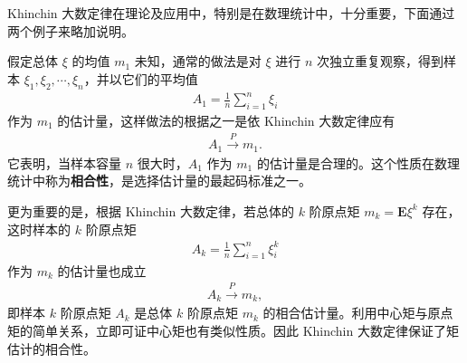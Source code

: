 \documentclass[../../main.tex]{subfiles}
\begin{document}
Khinchin 大数定律在理论及应用中，特别是在数理统计中，十分重要，下面通过两个例子来略加说明。

\begin{example}[矩估计的相合性]\label{example:ch05-矩估计相合性}
假定总体 $\xi$ 的均值 $m_1$ 未知，通常的做法是对 $\xi$ 进行 $n$ 次独立重复观察，得到样本 $\xi_1,\xi_2,\cdots,\xi_n$，并以它们的平均值
\begin{align*}
A_1=\frac1n\sum_{i=1}^{n}\xi_i
\end{align*}
作为 $m_1$ 的估计量，这样做法的根据之一是依 Khinchin 大数定律应有
\begin{align*}
A_1\xrightarrow{P}m_1.
\end{align*}
它表明，当样本容量 $n$ 很大时，$A_1$ 作为 $m_1$ 的估计量是合理的。这个性质在数理统计中称为\textbf{相合性}，是选择估计量的最起码标准之一。

更为重要的是，根据 Khinchin 大数定律，若总体的 $k$ 阶原点矩 $m_k=\boldsymbol{E}\xi^{k}$ 存在，这时样本的 $k$ 阶原点矩
\begin{align*}
A_k=\frac1n\sum_{i=1}^{n}\xi_i^{k}
\end{align*}
作为 $m_k$ 的估计量也成立
\begin{align}
A_k\xrightarrow{P}m_k,
\end{align}
即样本 $k$ 阶原点矩 $A_k$ 是总体 $k$ 阶原点矩 $m_k$ 的相合估计量。利用中心矩与原点矩的简单关系，立即可证中心矩也有类似性质。因此 Khinchin 大数定律保证了矩估计的相合性。
\end{example}
\end{document}
